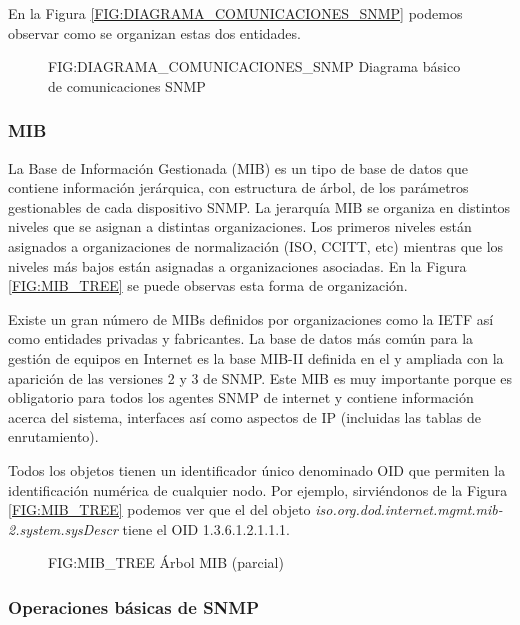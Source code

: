 En la Figura \ref{FIG:DIAGRAMA_COMUNICACIONES_SNMP} podemos observar como se organizan estas dos
entidades. 


\begin{figure}
    [Diagrama básico de comunicaciones SNMP]
    {FIG:DIAGRAMA_COMUNICACIONES_SNMP}
    {Diagrama básico de comunicaciones SNMP}
\end{figure}

\subsubsection{\gls{MIB}}
La Base de Información Gestionada (\gls{MIB}) es un tipo de base de datos que contiene información
jerárquica, con estructura de árbol, de los parámetros gestionables de cada dispositivo SNMP. La
jerarquía MIB se organiza en distintos niveles que se asignan a distintas organizaciones. Los 
primeros niveles están asignados a organizaciones de normalización (ISO, CCITT, etc) mientras que 
los niveles más bajos están asignadas a organizaciones asociadas. En la Figura \ref{FIG:MIB_TREE} 
se puede observas esta forma de organización.

Existe un gran número de MIBs definidos por organizaciones como la \gls{IETF} así como entidades
privadas y fabricantes. La base de datos más común para la gestión de equipos en Internet es la base
MIB-II definida en el  y ampliada con la aparición de las versiones 2 y 3 de SNMP. 
Este MIB es muy importante porque es obligatorio para todos los agentes SNMP de internet y contiene
información acerca del sistema, interfaces así como aspectos de IP (incluidas las tablas de
enrutamiento).

Todos los objetos tienen un identificador único denominado OID que permiten la identificación numérica
de cualquier nodo. Por ejemplo, sirviéndonos de la Figura \ref{FIG:MIB_TREE} podemos ver que el del
objeto \textit{iso.org.dod.internet.mgmt.mib-2.system.sysDescr} tiene el OID 1.3.6.1.2.1.1.1.

\begin{figure}
    [Árbol MIB (parcial)]
    {FIG:MIB_TREE}
    {Árbol MIB (parcial)}
\end{figure}

\subsubsection{Operaciones básicas de SNMP}

